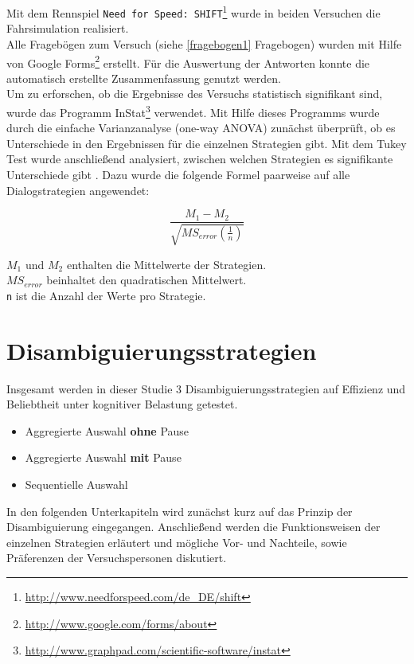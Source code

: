 \documentclass[12pt,a4paper]{scrartcl}
\begin{document}
Mit dem Rennspiel \texttt{Need for Speed: SHIFT}\footnote{\label{foot:nfs}\url{http://www.needforspeed.com/de_DE/shift}} wurde in beiden Versuchen die Fahrsimulation realisiert.\\

Alle Fragebögen zum Versuch (siehe \ref{fragebogen1} Fragebogen) wurden mit Hilfe von Google Forms\footnote{\label{foot:googelforms}\url{
http://www.google.com/forms/about}} erstellt. Für die Auswertung der Antworten konnte die automatisch erstellte Zusammenfassung genutzt werden.\\

Um zu erforschen, ob die Ergebnisse des Versuchs statistisch signifikant sind, wurde das Programm InStat\footnote{\label{foot:googelforms}\url{
http://www.graphpad.com/scientific-software/instat}} verwendet. 
Mit Hilfe dieses Programms wurde durch die einfache Varianzanalyse (one-way ANOVA) zunächst überprüft, ob es Unterschiede in den Ergebnissen für die einzelnen Strategien gibt. Mit dem Tukey Test wurde anschließend analysiert, zwischen welchen Strategien es signifikante Unterschiede gibt \cite{TukeyTest}. Dazu wurde die folgende Formel paarweise auf alle Dialogstrategien angewendet:

\begin{equation*}
\frac{M_1 - M_2}{\sqrt{MS_{error} (\frac{1}{n})}}
\end{equation*}

\texttt{$M_1$} und \texttt{$M_2$} enthalten die Mittelwerte der Strategien. \\
\texttt{$MS_{error}$} beinhaltet den quadratischen Mittelwert.\\
\texttt{n} ist die Anzahl der Werte pro Strategie.






\section{Disambiguierungsstrategien}
\label{disambiguierungsstrategien}
Insgesamt werden in dieser Studie 3 Disambiguierungsstrategien auf Effizienz und Beliebtheit unter kognitiver Belastung getestet.
\begin{itemize}
\item Aggregierte Auswahl \textbf{ohne} Pause
\item Aggregierte Auswahl \textbf{mit} Pause
\item Sequentielle Auswahl
\end{itemize}
In den folgenden Unterkapiteln wird zunächst kurz auf das Prinzip der Disambiguierung eingegangen. Anschließend werden die Funktionsweisen der einzelnen Strategien erläutert und mögliche Vor- und Nachteile, sowie Präferenzen der Versuchspersonen diskutiert.
\end{document}
